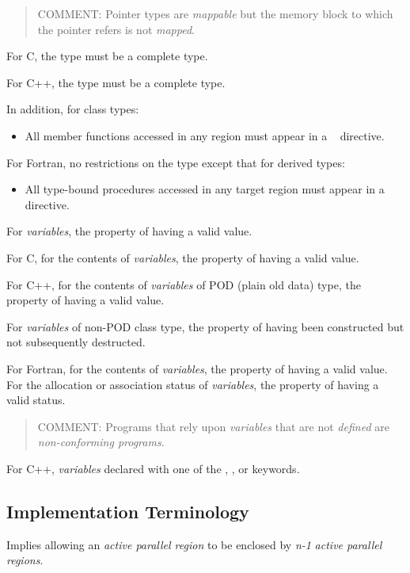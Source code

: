 \begin{quote}
COMMENT: Pointer types are \emph{mappable} but the memory block to which 
the pointer refers is not \emph{mapped}.
\end{quote}

For C, the type must be a complete type.

For C++, the type must be a complete type.

In addition, for class types:
\begin{itemize}
\item All member functions accessed in any  region must appear in a
~ directive.
\end{itemize}

For Fortran, no restrictions on the type except that for derived types:

\begin{itemize}
\item All type-bound procedures accessed in any target region must appear in a 
~ directive.
\end{itemize}
\glossarydefend

\glossarydefstart
For \emph{variables}, the property of having a valid value.

For C, for the contents of \emph{variables}, the property of having a valid 
value.

For C++, for the contents of \emph{variables} of POD (plain old data) type, 
the property of having a valid value.

For \emph{variables} of non-POD class type, the property of having been 
constructed but not subsequently destructed.

For Fortran, for the contents of \emph{variables}, the property of having 
a valid value. For the allocation or association status of \emph{variables}, 
the property of having a valid status.

\begin{quote}
COMMENT: Programs that rely upon \emph{variables} that are not \emph{defined} 
are \emph{non-conforming programs}.
\end{quote}
\glossarydefend

\glossarydefstart
For C++, \emph{variables} declared with one of the , , 
or  keywords.
\glossarydefend





\subsection{Implementation Terminology}
\label{subsec:Implementation Terminology}
\glossarydefstart
Implies allowing an \emph{active parallel region} to be enclosed by \emph{n-1} 
\emph{active parallel regions}.
\glossarydefend

